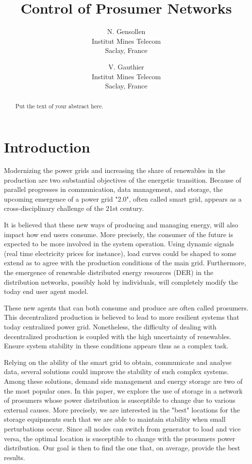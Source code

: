 \documentclass[10pt,twoside%
                ,draft%
        ]{article}
\title{Control of Prosumer Networks}
\author{
        N. Gensollen\\
        Institut Mines Telecom\\
        Saclay, France
\and
        V. Gauthier\\
        Institut Mines Telecom\\
        Saclay, France
}
\begin{document}
\maketitle


\begin{abstract}
Put the text of your abstract here.
\end{abstract}



\section{Introduction}

Modernizing the power grids and increasing the share of renewables in the production are two substantial objectives of the energetic transition. Because of parallel progresses in communication, data management, and storage, the upcoming emergence of a power grid "2.0", often called smart grid, appears as a cross-disciplinary challenge of the 21st century.

It is believed that these new ways of producing and managing energy, will also impact how end users consume. More precisely, the consumer   of the future is expected to be more involved in the system operation. Using dynamic signals (real time electricity prices for instance), load curves could be shaped to some extend as to agree with the production conditions of the main grid.
Furthermore, the emergence of renewable distributed energy 
 resources (DER) in the distribution networks, possibly hold by individuals,
will completely  
modify the today end user agent model.

These new agents that can both consume and produce are often called prosumers. This decentralized production is believed to lead to more resilient systems that today centralized power grid. Nonetheless, the difficulty of dealing with decentralized production is coupled with the high uncertainty of renewables. Ensure system stability in these conditions appears thus as a complex task. 

Relying on the ability of the smart grid to obtain, communicate and analyse data, several solutions could  improve the stability of such complex systems. Among these solutions, demand side management and energy storage are two of the most popular ones. In this paper, we explore the use of storage in a network of prosumers whose power distribution is susceptible to change due to various external causes. More precisely, we are interested in the "best" locations for the storage equipments such that we are able to maintain stability when small perturbations occur. Since all nodes can switch from generator to load and vice versa, the optimal location is susceptible to change with the prosumers power distribution.
Our goal is then to find the one that, on average, provide the best results.
\end{document}
